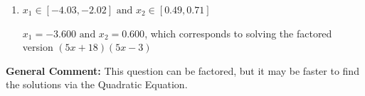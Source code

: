 \documentclass{extbook}[14pt]
\begin{document}
\begin{enumerate}
{\begin{enumerate}[label=\Alph*.]
* $x_1 = -1.200 \text{ and } x_2 = 1.800$, which is the correct option. Obtained by solving the factored version $(5x + 6)(5x -9)$
\item \( x_1 \in [-4.03, -2.02] \text{ and } x_2 \in [0.49, 0.71] \)

$x_1 = -3.600 \text{ and } x_2 = 0.600$, which corresponds to solving the factored version $(5x + 18)(5x -3)$
\end{enumerate}

\textbf{General Comment:} This question can be factored, but it may be faster to find the solutions via the Quadratic Equation.
}
\end{enumerate}
\end{document}
